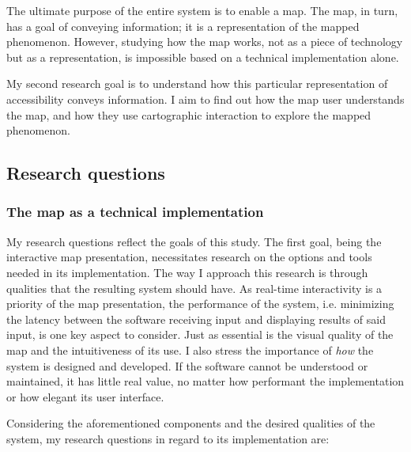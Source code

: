 The ultimate purpose of the entire system is to enable a map.
The map, in turn, has a goal of conveying information;
it is a representation of the mapped phenomenon.
However, studying how the map works,
not as a piece of technology but as a representation,
is impossible based on a technical implementation alone.

My second research goal is to understand how
this particular representation of accessibility conveys information.
I aim to find out how the map user understands the map,
and how they use cartographic interaction to explore the mapped phenomenon.


\subsection{Research questions}

\subsubsection{The map as a technical implementation}

My research questions reflect the goals of this study.  %
The first goal, being the interactive map presentation,
necessitates research on the options and tools
needed in its implementation.
The way I approach this research is through qualities
that the resulting system should have.
As real-time interactivity is a priority of the map presentation,
the performance of the system,
i.e. minimizing the latency between
the software receiving input and displaying results of said input,
is one key aspect to consider.
Just as essential is the visual quality of the map
and the intuitiveness of its use.
I also stress the importance of
\textit{how} the system is designed and developed.
If the software cannot be understood or maintained,
it has little real value,
no matter how performant the implementation or how elegant its user interface.



Considering the aforementioned components
and the desired qualities of the system,
my research questions in regard to its implementation are:

